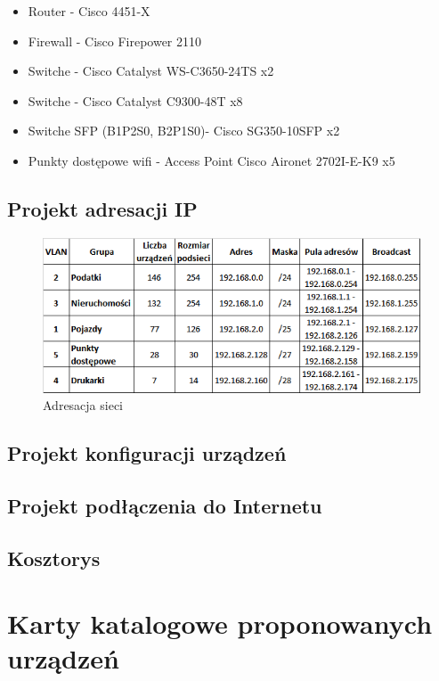 \documentclass[12pt,a4paper]{article}
\begin{document}
	\begin{itemize}
		\item Router - Cisco 4451-X
		\item Firewall - Cisco Firepower 2110
		\item Switche - Cisco Catalyst WS-C3650-24TS x2
		\item Switche - Cisco Catalyst C9300-48T x8
		\item Switche SFP (B1P2S0, B2P1S0)- Cisco SG350-10SFP x2
		\item Punkty dostępowe wifi - Access Point Cisco Aironet 2702I-E-K9 x5
	\end{itemize}

	\subsection{Projekt adresacji IP}
	
		\begin{figure}[H]
			\centerin
			\includegraphics[width = \textwidth]{obrazki/vlany.png}
			\caption{Adresacja sieci}
			\label{fig:vlany}
		\end{figure}
	    
	\subsection{Projekt konfiguracji urządzeń}
	
	\subsection{Projekt podłączenia do Internetu}
	
	\subsection{Kosztorys}
	
	\section{Karty katalogowe proponowanych urządzeń}
	
\end{document}
